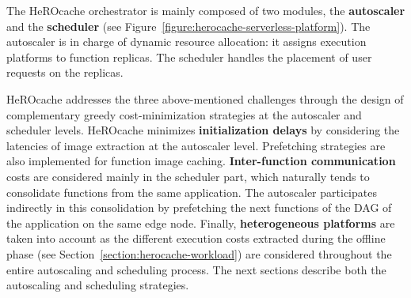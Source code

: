 The HeROcache orchestrator is mainly composed of two modules, the \textbf{autoscaler} and the \textbf{scheduler} (see Figure~\ref{figure:herocache-serverless-platform}). The autoscaler is in charge of dynamic resource allocation: it assigns execution platforms to function replicas. The scheduler handles the placement of user requests on the replicas.

HeROcache addresses the three above-mentioned challenges through the design of complementary greedy cost-minimization strategies at the autoscaler and scheduler levels. HeROcache minimizes \textbf{initialization delays} by considering the latencies of image extraction at the autoscaler level. Prefetching strategies are also implemented for function image caching. \textbf{Inter-function communication} costs are considered mainly in the scheduler part, which naturally tends to consolidate functions from the same application. The autoscaler participates indirectly in this consolidation by prefetching the next functions of the DAG of the application on the same edge node. Finally, \textbf{heterogeneous platforms} are taken into account as the different execution costs extracted during the offline phase (see Section~\ref{section:herocache-workload}) are considered throughout the entire autoscaling and scheduling process. %
The next sections describe both the autoscaling and scheduling strategies. %
